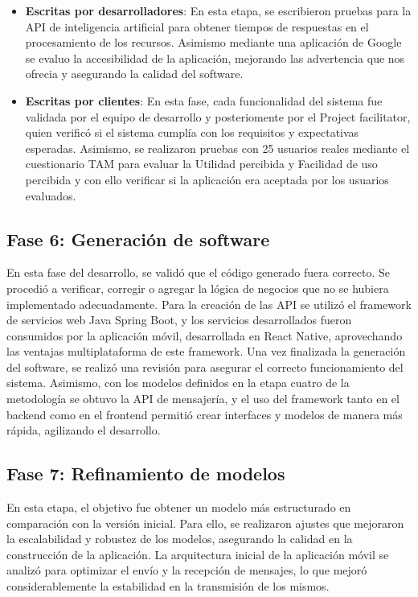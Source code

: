\documentclass[lettersize,journal]{IEEEtran}
\begin{document}
       	\begin{itemize}
       		\item \textbf{Escritas por desarrolladores}: En esta etapa, se escribieron pruebas para la API de inteligencia artificial para obtener tiempos de respuestas en el procesamiento de los recursos.  Asimismo mediante una aplicación de Google se evaluo la accesibilidad de la aplicación, mejorando las advertencia que nos ofrecia y asegurando la calidad del software.  
       		
       		\item \textbf{Escritas por clientes}: En esta fase, cada funcionalidad del sistema fue validada por el equipo de desarrollo y posteriomente por el Project facilitator, quien verificó si el sistema cumplía con los requisitos y expectativas esperadas. Asimismo, se realizaron pruebas con 25 usuarios reales mediante el cuestionario TAM para evaluar la Utilidad percibida y Facilidad de uso percibida y con ello verificar si la aplicación era aceptada por los usuarios evaluados.
       	\end{itemize}
       	
	     \subsection{Fase 6: Generación de software}
	     
	     En esta fase del desarrollo, se validó que el código generado fuera correcto. Se procedió a verificar, corregir o agregar la lógica de negocios que no se hubiera implementado adecuadamente. Para la creación de las API se utilizó el framework de servicios web Java Spring Boot, y los servicios desarrollados fueron consumidos por la aplicación móvil, desarrollada en React Native, aprovechando las ventajas multiplataforma de este framework. Una vez finalizada la generación del software, se realizó una revisión para asegurar el correcto funcionamiento del sistema. Asimismo, con los modelos definidos en la etapa cuatro de la metodología se obtuvo la API de mensajería, y el uso del framework tanto en el backend como en el frontend permitió crear interfaces y modelos de manera más rápida, agilizando el desarrollo. 
	  
         \subsection{Fase 7: Refinamiento de modelos}
         
         En esta etapa, el objetivo fue obtener un modelo más estructurado en comparación con la versión inicial. Para ello, se realizaron ajustes que mejoraron la escalabilidad y robustez de los modelos, asegurando la calidad en la construcción de la aplicación. La arquitectura inicial de la aplicación móvil se analizó para optimizar el envío y la recepción de mensajes, lo que mejoró considerablemente la estabilidad en la transmisión de los mismos.
         
\end{document}
